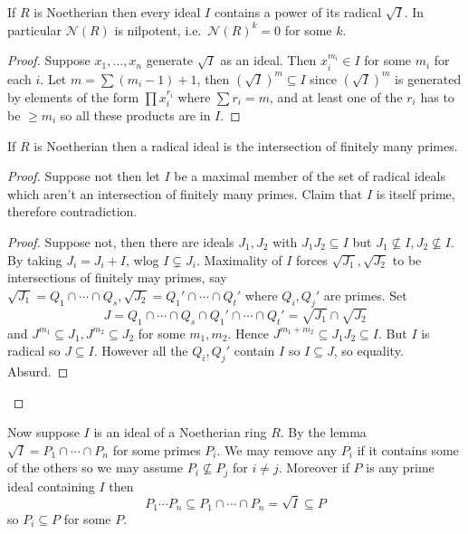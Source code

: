 \documentclass[a4paper]{article}
\newcommand{\nilrad}[1]{\mathcal{N}({#1})} %
\begin{document}
\begin{lemma}
  If \(R\) is Noetherian then every ideal \(I\) contains a power of its radical \(\sqrt I\). In particular \(\nilrad R\) is nilpotent, i.e.\ \(\nilrad R^k = 0\) for some \(k\).
\end{lemma}

\begin{proof}
  Suppose \(x_1, \dots, x_n\) generate \(\sqrt I\) as an ideal. Then \(x_i^{m_i} \in I\) for some \(m_i\) for each \(i\). Let \(m = \sum (m_i - 1) + 1\), then \((\sqrt I)^m \subseteq I\) since \((\sqrt I)^m\) is generated by elements of the form \(\prod x_i^{r_i}\) where \(\sum r_i = m\), and at least one of the \(r_i\) has to be \(\geq m_i\) so all these products are in \(I\).
\end{proof}

\begin{lemma}
  If \(R\) is Noetherian then a radical ideal is the intersection of finitely many primes.
\end{lemma}

\begin{proof}
  Suppose not then let \(I\) be a maximal member of the set of radical ideals which aren't an intersection of finitely many primes. Claim that \(I\) is itself prime, therefore contradiction.
  \begin{proof}
    Suppose not, then there are ideals \(J_1, J_2\) with \(J_1J_2 \subseteq I\) but \(J_1 \nsubseteq I, J_2 \nsubseteq I\). By taking \(J_i = J_i + I\), wlog \(I \subsetneq J_i\). Maximality of \(I\) forces \(\sqrt{J_1}, \sqrt{J_2}\) to be intersections of finitely may primes, say \(\sqrt{J_1} = Q_1 \cap \cdots \cap Q_s, \sqrt{J_2} = Q_1' \cap \cdots \cap Q_t'\) where \(Q_i, Q_j'\) are primes. Set
    \[
      J = Q_1 \cap \cdots \cap Q_s \cap Q_1' \cap \cdots \cap Q_t' = \sqrt{J_1} \cap \sqrt{J_2}
    \]
    and \(J^{m_1} \subseteq J_1, J^{m_2} \subseteq J_2\) for some \(m_1, m_2\). Hence \(J^{m_1 + m_2} \subseteq J_1J_2 \subseteq I\). But \(I\) is radical so \(J \subseteq I\). However all the \(Q_i, Q_j'\) contain \(I\) so \(I \subseteq J\), so equality. Absurd.
  \end{proof}
\end{proof}

Now suppose \(I\) is an ideal of a Noetherian ring \(R\). By the lemma \(\sqrt I = P_1 \cap \cdots \cap P_n\) for some primes \(P_i\). We may remove any \(P_i\) if it contains some of the others so we may assume \(P_i \nsubseteq P_j\) for \(i \neq j\). Moreover if \(P\) is any prime ideal containing \(I\) then
\[
  P_1 \cdots P_n \subseteq P_1 \cap \cdots \cap P_n = \sqrt I \subseteq P
\]
so \(P_i \subseteq P\) for some \(P\).
\end{document}
